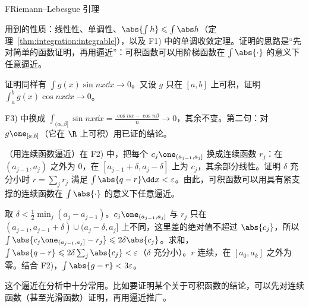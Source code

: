 \begin{probleme}{F}{Riemann--Lebesgue 引理}
\begin{questions}
\begin{solution}
用到的性质：线性性、单调性、$\abs{\int h}\leqslant\int\abs h$（定理~\ref{thm:integration:integrable}），以及 F1) 中的单调收敛定理。证明的思路是“先对简单的函数证明，再用逼近”：可积函数可以用阶梯函数在 $\int\abs{\cdot}$ 的意义下任意逼近。
\end{solution}
\item 证明同样有 $\int g(x)\sin nx\dd x\to0$。又设 $g$ 只在 $[a,b]$ 上可积，证明 $\int_a^bg(x)\cos nx\dd x\to0$。
\begin{solution}
F3) 中换成 $\int_{(\alpha,\beta]}\sin nx\dd x=\frac{\cos n\alpha-\cos n\beta}n\to0$，其余不变。第二句：对 $g\one_{[a,b]}$（它在 $\R$ 上可积）用已证的结论。
\end{solution}
\item （用连续函数逼近）在 F2) 中，把每个 $c_j\one_{(a_{j-1},a_j]}$ 换成连续函数 $r_j$：在 $(a_{j-1},a_j)$ 之外为 $0$，在 $[a_{j-1}+\delta,a_j-\delta]$ 上为 $c_j$，其余部分线性。证明 $\delta$ 充分小时 $r=\sum_jr_j$ 满足 $\int\abs{q-r}\dd x<\varepsilon$。由此，可积函数可以用具有紧支撑的连续函数在 $\int\abs{\cdot}$ 的意义下任意逼近。
\begin{solution}
取 $\delta<\frac12\min_j(a_j-a_{j-1})$。$c_j\one_{(a_{j-1},a_j]}$ 与 $r_j$ 只在 $(a_{j-1},a_{j-1}+\delta)\cup(a_j-\delta,a_j]$ 上不同，这里差的绝对值不超过 $\abs{c_j}$，所以 $\int\abs{c_j\one_{(a_{j-1},a_j]}-r_j}\leqslant2\delta\abs{c_j}$。求和，$\int\abs{q-r}\leqslant2\delta\sum_j\abs{c_j}<\varepsilon$（$\delta$ 充分小）。$r$ 连续，在 $[a_0,a_k]$ 之外为零。结合 F2)，$\int\abs{g-r}<3\varepsilon$。

这个逼近在分析中十分常用。比如要证明某个关于可积函数的结论，可以先对连续函数（甚至光滑函数）证明，再用逼近推广。
\end{solution}
\end{questions}
\end{probleme}
